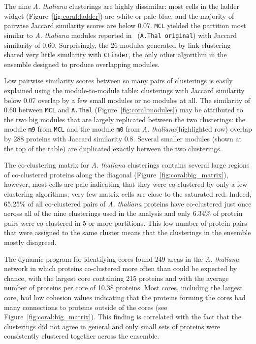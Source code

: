 \documentclass[12pt]{cmuthesis}
\newcommand{\Athal}{\textit{A. thaliana}\xspace}
\begin{document}

  The nine \Athal clusterings are highly dissimilar: most cells in the ladder widget (Figure~\ref{fig:coral:ladder}) are white or pale blue, and the majority of pairwise Jaccard similarity scores are below 0.07. \texttt{MCL} yielded the partition most similar to \Athal modules reported in~\cite{Vidal2011} (\texttt{A.Thal original}) with Jaccard similarity of 0.60. Surprisingly, the 26 modules generated by link clustering~\cite{Vidal2011} shared very little similarity with \texttt{CFinder}, the only other algorithm in the ensemble designed to produce overlapping modules.


  Low pairwise similarity scores between so many pairs of clusterings is easily explained using the module-to-module table: clusterings with Jaccard similarity below 0.07 overlap by a few small modules or no modules at all. The similarity of 0.60 between \texttt{MCL} and \texttt{A.Thal} (Figure~\ref{fig:coral:modules}) may be attributed to the two big modules that are largely replicated between the two clusterings: the module \texttt{m9} from \texttt{MCL} and the module \texttt{m0} from \Athal (highlighted row) overlap by 288 proteins with Jaccard similarity 0.8. Several smaller modules (shown at the top of the table) are duplicated exactly between the two clusterings.


  The co-clustering matrix for \Athal clusterings contains several large regions of co-clustered proteins along the diagonal (Figure~\ref{fig:coral:big_matrix}), however, most cells are pale indicating that they were co-clustered by only a few clustering algorithms; very few matrix cells are close to the saturated red. Indeed, 65.25\% of all co-clustered pairs of \Athal proteins have co-clustered just once across all of the nine clusterings used in the analysis and only 6.34\% of protein pairs were co-clustered in 5 or more partitions. This low number of protein pairs that were assigned to the same cluster means that the clusterings in the ensemble mostly disagreed.


  The dynamic program for identifying cores found 249 areas in the \Athal network in which proteins co-clustered more often than could be expected by chance, with the largest core containing 215 proteins and with the average number of proteins per core of 10.38 proteins. Most cores, including the largest core, had low cohesion values indicating that the proteins forming the cores had many connections to proteins outside of the cores (see Figure~\ref{fig:coral:big_matrix}). This finding is correlated with the fact that the clusterings did not agree in general and only small sets of proteins were consistently clustered together across the ensemble.
\end{document}
